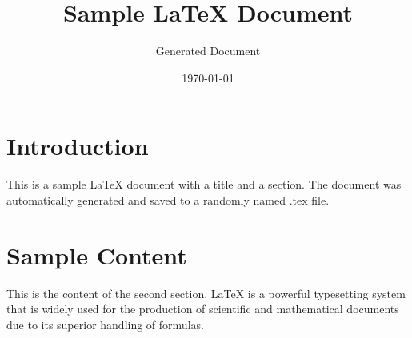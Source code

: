 \documentclass{article}
\title{Sample LaTeX Document}
\author{Generated Document}
\date{\today}
\begin{document}
\maketitle

\section{Introduction}
This is a sample LaTeX document with a title and a section. The document was automatically generated and saved to a randomly named .tex file.

\section{Sample Content}
This is the content of the second section. LaTeX is a powerful typesetting system that is widely used for the production of scientific and mathematical documents due to its superior handling of formulas.
\end{document}
